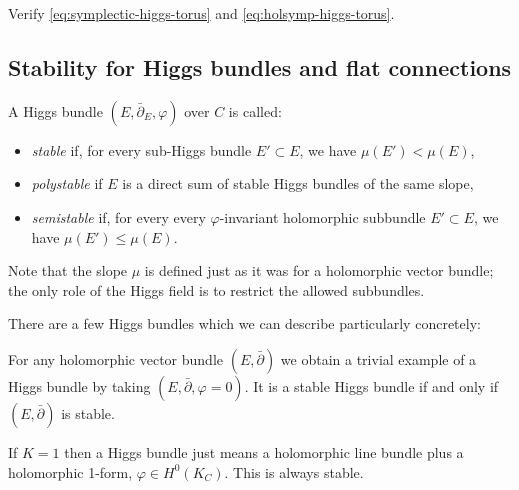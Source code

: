 \documentclass[12pt,letterpaper,reqno]{article}
\numberwithin{equation}{section}
\newcommand{\cM}{\ensuremath{\mathcal M}}
\newcommand{\C}{\ensuremath{\mathbb C}}
\newcommand{\ti}[1]{\textit{#1}}
\begin{document}
\begin{exercise} Verify \eqref{eq:symplectic-higgs-torus} and
\eqref{eq:holsymp-higgs-torus}.
\end{exercise}



\subsection{Stability for Higgs bundles and flat connections}

\begin{defn} A Higgs bundle $(E, \bar\partial_E, \varphi)$ over $C$ is called:
\begin{itemize}
\item \ti{stable} if, for every sub-Higgs bundle $E' \subset E$,
we have $\mu(E') < \mu(E)$,
\item \ti{polystable} if $E$ is a direct sum of stable Higgs bundles
of the same slope,
\item \ti{semistable} if, for every every $\varphi$-invariant
holomorphic subbundle
$E' \subset E$, we have $\mu(E') \le \mu(E)$.
\end{itemize}
\end{defn}
Note that the slope $\mu$ is defined just as it was for a holomorphic
vector bundle; the only role of the Higgs field is to restrict
the allowed subbundles.

There are a few Higgs bundles which we can describe particularly
concretely:

\begin{example} For any holomorphic vector
bundle $(E,\bar\partial)$ we obtain a trivial example of a Higgs bundle
by taking $(E,\bar\partial,\varphi=0)$. It is a stable Higgs bundle
if and only if $(E,\bar\partial)$ is stable.
\end{example}

\begin{example} If $K=1$ then a Higgs bundle
just means a holomorphic line bundle plus a holomorphic 1-form,
$\varphi \in H^0(K_C)$. This is always stable.
\end{example}
\end{document}
